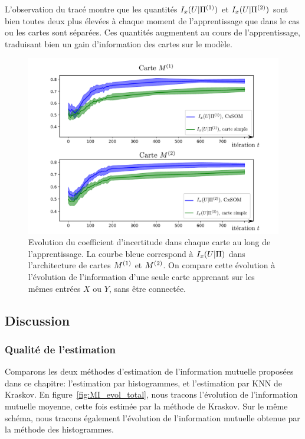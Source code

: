 L'observation du tracé montre que les quantités $I_x(U|\Pi^{({1})})$ et $I_x(U|\Pi^{({2})})$ sont bien toutes deux plus élevées à chaque moment de l'apprentissage que dans le cas ou les cartes sont séparées. Ces quantités augmentent au cours de l'apprentissage, traduisant bien un gain d'information des cartes sur le modèle.

\begin{figure}
\includegraphics[width=\textwidth]{evolution_MI_binning}
\caption{Evolution du coefficient d'incertitude dans chaque carte au long de l'apprentissage. La courbe bleue correspond à $I_x(U|\Pi)$ dans l'architecture de cartes $M^{({1})}$ et $M^{({2})}$. On compare cette évolution à l'évolution de l'information d'une seule carte apprenant sur les mêmes entrées $X$ ou $Y$, sans être connectée.}
\label{fig:MI_evol}
\end{figure}

\subsection{Discussion}

\subsubsection{Qualité de l'estimation}

Comparons les deux méthodes d'estimation de l'information mutuelle proposées dans ce chapitre: l'estimation par histogrammes, et l'estimation par KNN de Kraskov.
En figure~\ref{fig:MI_evol_total}, nous tracons l'évolution de l'information mutuelle moyenne, cette fois estimée par la méthode de Kraskov. Sur le même schéma, nous tracons également l'évolution de l'information mutuelle obtenue par la méthode des histogrammes. 

